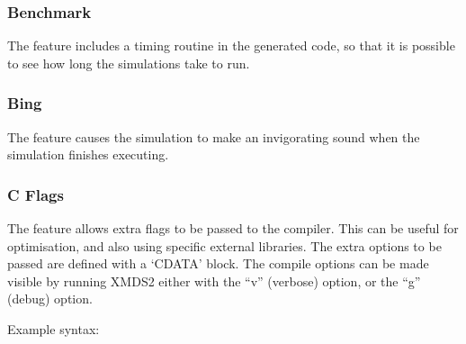 \documentclass[letterpaper,10pt,english]{sphinxmanual}
\begin{document}
\ignorespaces 

\subsubsection{Benchmark}
\label{\detokenize{reference_elements:benchmark}}\label{\detokenize{reference_elements:index-10}}\label{\detokenize{reference_elements:id1}}
\sphinxAtStartPar
The  feature includes a timing routine in the generated code, so that it is possible to see how long the simulations take to run.

\ignorespaces 

\subsubsection{Bing}
\label{\detokenize{reference_elements:bing}}\label{\detokenize{reference_elements:index-11}}\label{\detokenize{reference_elements:id2}}
\sphinxAtStartPar
The  feature causes the simulation to make an invigorating sound when the simulation finishes executing.

\ignorespaces 

\subsubsection{C Flags}
\label{\detokenize{reference_elements:c-flags}}\label{\detokenize{reference_elements:cflags}}\label{\detokenize{reference_elements:index-12}}
\sphinxAtStartPar
The  feature allows extra flags to be passed to the compiler.  This can be useful for optimisation, and also using specific external libraries.  The extra options to be passed are defined with a ‘CDATA’ block.  The compile options can be made visible by running XMDS2 either with the “\sphinxhyphen{}v” (verbose) option, or the “\sphinxhyphen{}g” (debug) option.

\sphinxAtStartPar
Example syntax:

\begin{sphinxVerbatim}[commandchars=\\\{\}]
    \PYG{c+cp}{\PYGZlt{}![CDATA[}
    \PYG{c+cp}{]]\PYGZgt{}}
\end{sphinxVerbatim}
\end{document}
